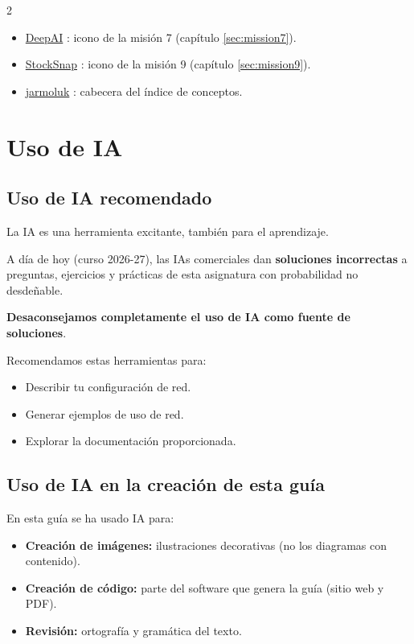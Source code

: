 \begin{multicols}{2}
\begin{itemize}
\item \href{https://deepai.org/machine-learning-model/text2img}{DeepAI} : icono de la misión 7 (capítulo \ref{sec:mission7}).
\item \href{https://pixabay.com/photos/architecture-building-infrastructure-2566798/}{StockSnap} : icono de la misión 9 (capítulo \ref{sec:mission9}).
\item \href{https://pixabay.com/photos/list-surnames-table-personal-data-428312/}{jarmoluk} : cabecera del índice de conceptos.
\end{itemize}
\end{multicols}

\newpage

\section*{Uso de IA}

\subsection*{Uso de IA recomendado}

\noindent La IA es una herramienta excitante, también para el aprendizaje.

A día de hoy (curso 2026-27),
las IAs comerciales dan \textbf{soluciones incorrectas} a preguntas, ejercicios y prácticas
de esta asignatura con probabilidad no desdeñable.


\textbf{Desaconsejamos completamente el uso de IA como fuente de soluciones}.

Recomendamos estas herramientas para:

\begin{itemize}
\item Describir tu configuración de red.
\item Generar ejemplos de uso de red.
\item Explorar la documentación proporcionada.
\end{itemize}


\subsection*{Uso de IA en la creación de esta guía}

\noindent En esta guía se ha usado IA para:

\begin{itemize}
\item \textbf{Creación de imágenes:} ilustraciones decorativas (no los diagramas con contenido).
\item \textbf{Creación de código:} parte del software que genera la guía (sitio web y PDF).
\item \textbf{Revisión:} ortografía y gramática del texto.
\end{itemize}

\begin{center}
\end{center}


